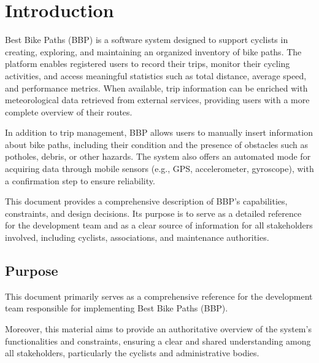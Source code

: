 \chapter{Introduction}
\label{ch:introduction}%
\par Best Bike Paths (BBP) is a software system designed to support cyclists in creating, exploring, and maintaining an organized inventory of bike paths. The platform enables registered users to record their trips, monitor their cycling activities, and access meaningful statistics such as total distance, average speed, and performance metrics. When available, trip information can be enriched with meteorological data retrieved from external services, providing users with a more complete overview of their routes.

In addition to trip management, BBP allows users to manually insert information about bike paths, including their condition and the presence of obstacles such as potholes, debris, or other hazards. The system also offers an automated mode for acquiring data through mobile sensors (e.g., GPS, accelerometer, gyroscope), with a confirmation step to ensure reliability.

This document provides a comprehensive description of BBP's capabilities, constraints, and design decisions. Its purpose is to serve as a detailed reference for the development team and as a clear source of information for all stakeholders involved, including cyclists, associations, and maintenance authorities.

\section{Purpose}
\label{sec:purpose}%
\par This document primarily serves as a comprehensive reference for the development team responsible for implementing Best Bike Paths (BBP).

\par Moreover, this material aims to provide an authoritative overview of the system’s functionalities and constraints, ensuring a clear and shared understanding among all stakeholders, particularly the cyclists and administrative bodies.

\pagebreak

